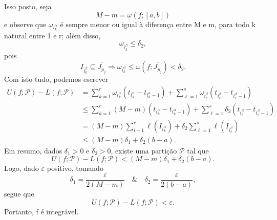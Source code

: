 \documentclass[../analysisII_notes.tex]{subfiles}
\begin{document}
\begin{proof*}
	Isso posto, seja
	\[
		M-m = \omega (f; [a, b])
	\]
	e observe que \(\omega_{i^{\alpha }_{k}}\) é sempre menor ou igual à diferença entre M e m, para todo k natural entre 1 e r; além disso,
	\[
		\omega_{i^{\beta }_{k}}\leq \delta_{2},
	\]
	pois
	\[
		I_{i_{k}^{\beta }}\subseteq \overline{J_{p_{j}}} \Rightarrow \omega_{i^{\alpha }_{k}} \leq \omega (f; \overline{J_{p_{j}}}) < \delta_{2}.
	\]
	Com isto tudo, podemos escrever
	\begin{align*}
		U(f; \mathcal{P}) - L(f; \mathcal{P}) & =\sum\limits_{k=1}^{r}\omega_{i^{\alpha }_{k}}(t_{i^{\alpha }_{k}}-t_{i^{\alpha }_{k}-1}) + \sum\limits_{\ell =1}^{s}\omega_{i_{\ell }^{\beta }}(t_{i_{\ell }^{\beta }}-t_{i_{\ell }^{\beta }-1}) \\
		                                      & \leq \sum\limits_{k=1}^{r}(M-m)(t_{i_{k}^{\alpha }}-t_{i_{k}^{\alpha }-1}) + \sum\limits_{\ell =1}^{s}\delta_{2}(t_{i_{\ell }^{\beta }}-t_{i_{\ell }^{\beta }-1})                                 \\
		                                      & = (M-m)\sum\limits_{i-1}^{r}\ell (I_{i_k^{\alpha  }}) + \delta_2\sum\limits_{\ell =1}^{s}\ell (I_{i_{\ell }^{\beta }})                                                                            \\
		                                      & \leq (M-m)\delta_{1} + \delta_{2}(b-a).
	\end{align*}
	Em resumo, dados \(\delta_1 > 0\) e \(\delta_2 > 0\), existe uma partição \(\mathcal{P}\)  tal que
	\[
		U(f; \mathcal{P}) - L(f; \mathcal{P}) < (M-m)\delta_1 + \delta_2(b-a).
	\]
	Logo, dado \(\varepsilon \) positivo, tomando
	\[
		\delta_1 = \frac{\varepsilon }{2(M-m)}\quad\&\quad \delta_2 = \frac{\varepsilon }{2(b-a)},
	\]
	segue que
	\[
		U(f; \mathcal{P})-L(f; \mathcal{P}) < \varepsilon .
	\]
	Portanto, f é integrável. \qedsymbol

\end{proof*}
\end{document}
